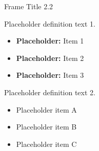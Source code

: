 \documentclass{beamer}
\begin{document}
\begin{frame}{Frame Title 2.2} %
    \begin{definition}
        Placeholder definition text 1.
    \end{definition}

    \begin{itemize}\scriptsize
        \item \textbf{Placeholder:} Item 1
        \item \textbf{Placeholder:} Item 2
        \item \textbf{Placeholder:} Item 3
    \end{itemize}

    \begin{definition}
        Placeholder definition text 2.
    \end{definition}

    \begin{itemize}\scriptsize
        \item Placeholder item A
        \item Placeholder item B
        \item Placeholder item C
    \end{itemize}
\end{frame}
\end{document}
